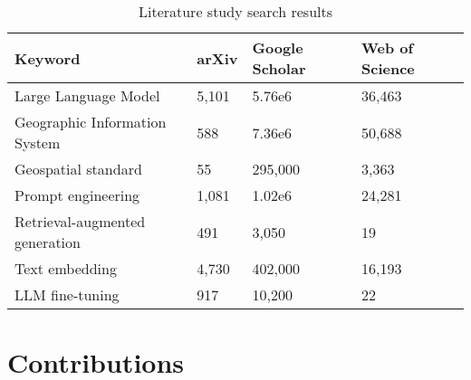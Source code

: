 
\begin{table}
    \centering
    \begin{tabular}{p{5.5cm}|p{2cm}p{2cm}p{2cm}}
        \toprule
        \textbf{Keyword}               & \textbf{arXiv} & \textbf{Google Scholar} & \textbf{Web of Science} \\
        \midrule
        Large Language Model           & 5,101          & 5.76e6                  & 36,463                  \\
        Geographic Information System  & 588            & 7.36e6                  & 50,688                  \\
        Geospatial standard            & 55             & 295,000                 & 3,363                   \\
        Prompt engineering             & 1,081          & 1.02e6                  & 24,281                  \\
        Retrieval-augmented generation & 491            & 3,050                   & 19                      \\
        Text embedding                 & 4,730          & 402,000                 & 16,193                  \\
        LLM fine-tuning                & 917            & 10,200                  & 22                      \\
        \bottomrule
    \end{tabular}
    \caption{Literature study search results}
    \label{tbl:literature-search-results}
\end{table}

\section{Contributions}
\label{sec:introContributions}

